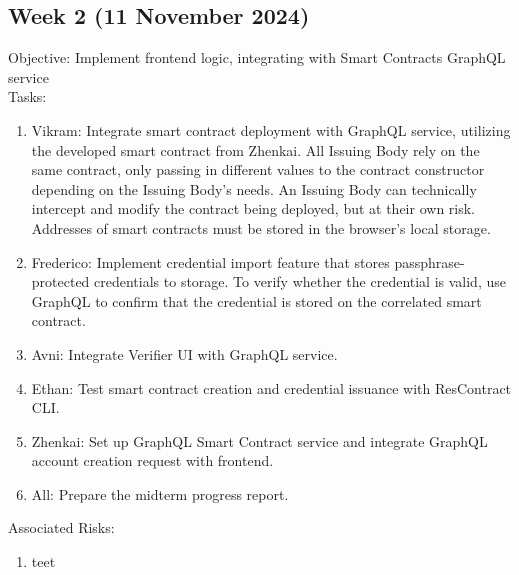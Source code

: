 \subsection{Week 2 (11 November 2024)}
Objective: Implement frontend logic, integrating with Smart Contracts GraphQL service \\
Tasks: 
\begin{enumerate}
    \item Vikram: Integrate smart contract deployment with GraphQL service, utilizing the developed smart contract from Zhenkai. All Issuing Body rely on the same contract, only passing in different values to the contract constructor depending on the Issuing Body’s needs. An Issuing Body can technically intercept and modify the contract being deployed, but at their own risk. Addresses of smart contracts must be stored in the browser's local storage.
    \item Frederico: Implement credential import feature that stores passphrase-protected credentials to storage. To verify whether the credential is valid, use GraphQL to confirm that the credential is stored on the correlated smart contract.
    \item Avni: Integrate Verifier UI with GraphQL service.
    \item Ethan: Test smart contract creation and credential issuance with ResContract CLI.
    \item Zhenkai: Set up GraphQL Smart Contract service and integrate GraphQL account creation request with frontend.
    \item All: Prepare the midterm progress report.
\end{enumerate}
Associated Risks:
\begin{enumerate}
    \item teet
\end{enumerate}

